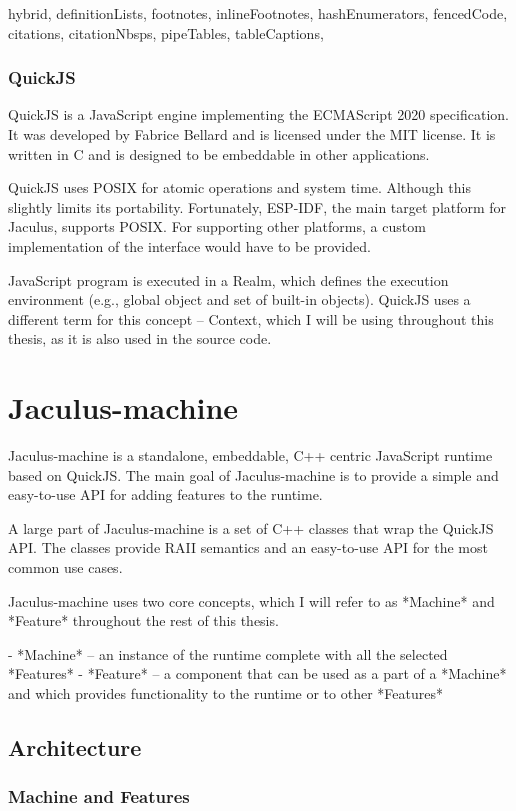 \documentclass[
  digital,
  oneside,
  nosansbold,
  nocolorbold,
  lof,
  lot
]{fithesis4}
\begin{document}
\begin{markdown*}{%
  hybrid,
  definitionLists,
  footnotes,
  inlineFootnotes,
  hashEnumerators,
  fencedCode,
  citations,
  citationNbsps,
  pipeTables,
  tableCaptions,
}
\subsection{QuickJS}

QuickJS is a JavaScript engine implementing the ECMAScript 2020 specification. It was developed by Fabrice Bellard and is licensed under the MIT license. It is written in C and is designed to be embeddable in other applications.

QuickJS uses POSIX for atomic operations and system time. Although this slightly limits its portability. Fortunately, ESP-IDF, the main target platform for Jaculus, supports POSIX. For supporting other platforms, a custom implementation of the interface would have to be provided.

JavaScript program is executed in a Realm, which defines the execution environment (e.g., global object and set of built-in objects). QuickJS uses a different term for this concept -- Context, which I will be using throughout this thesis, as it is also used in the source code.


\chapter{Jaculus-machine}

Jaculus-machine is a standalone, embeddable, C++ centric JavaScript runtime based on QuickJS. The main goal of Jaculus-machine is to provide a simple and easy-to-use API for adding features to the runtime.

A large part of Jaculus-machine is a set of C++ classes that wrap the QuickJS API. The classes provide RAII semantics and an easy-to-use API for the most common use cases.

Jaculus-machine uses two core concepts, which I will refer to as *Machine* and *Feature* throughout the rest of this thesis.

  - *Machine* -- an instance of the runtime complete with all the selected *Features*
  - *Feature* -- a component that can be used as a part of a *Machine* and which provides functionality to the runtime or to other *Features*

\section{Architecture}

\subsection{Machine and Features}


\end{markdown*}
\end{document}
